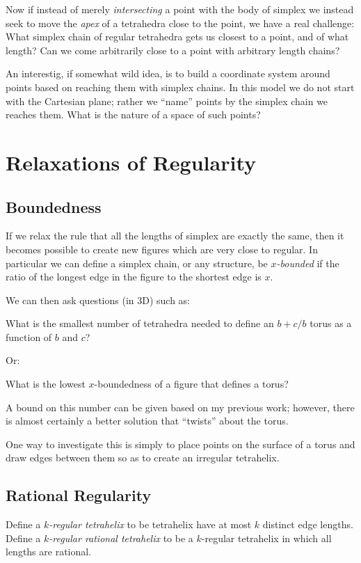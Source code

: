 \documentclass[11pt]{article}
\begin{document}
Now if instead of merely {\em intersecting} a point with the body of simplex we instead seek to move the {\em apex} of a tetrahedra close
to the point, we have a real challenge: What simplex chain of regular tetrahedra gets us closest to a point, and of what length? Can
we come arbitrarily close to a point with arbitrary length chains?

An interestig, if somewhat wild idea, is to build a coordinate system around points based on reaching them with simplex chains. In this model
we do not start with the Cartesian plane; rather we ``name'' points by the simplex chain we reaches them. What is the nature of a space
of such points? 



\section{Relaxations of Regularity}
\subsection{Boundedness}

If we relax the rule that all the lengths of simplex are exactly the same, then it becomes possible to create new figures which are
very close to regular. In particular we can define a simplex chain, or any structure, be {\em $x$-bounded} if the ratio of the longest edge
in the figure to the shortest edge is $x$.

We can then ask questions (in 3D) such as:

What is the smallest number of tetrahedra needed to define an $b+c/b$ torus as a function of $b$ and $c$?

Or:

What is the lowest $x$-boundedness of a figure that defines a torus?

A bound on this number can be given based on my previous work; however, there is almost certainly a better solution that ``twists'' about the torus.

One way to investigate this is simply to place points on the surface of a torus and draw edges between them so as to create an irregular tetrahelix.

\subsection{Rational Regularity}

Define a {\em $k$-regular tetrahelix} to be tetrahelix have at most $k$ distinct edge lengths.
Define a {\em $k$-regular rational tetrahelix} to be a $k$-regular tetrahelix in which all lengths are rational.
\end{document}
